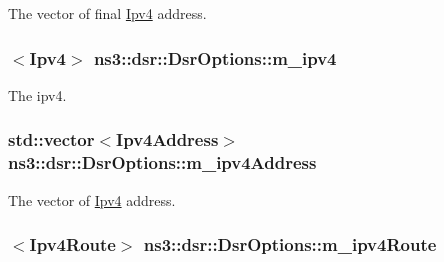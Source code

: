 The vector of final \hyperlink{classns3_1_1Ipv4}{Ipv4} address. 

\subsubsection[{\texorpdfstring{m\+\_\+ipv4}{m_ipv4}}]{$<${\bf Ipv4}$>$ ns3\+::dsr\+::\+Dsr\+Options\+::m\+\_\+ipv4\hspace{0.3cm}{\ttfamily [protected]}}\hypertarget{classns3_1_1dsr_1_1DsrOptions_aa4b94045e6c0467666c4e4efa63c7a4d}{}\label{classns3_1_1dsr_1_1DsrOptions_aa4b94045e6c0467666c4e4efa63c7a4d}


The ipv4. 

\subsubsection[{\texorpdfstring{m\+\_\+ipv4\+Address}{m_ipv4Address}}]{\setlength{\rightskip}{0pt plus 5cm}std\+::vector$<${\bf Ipv4\+Address}$>$ ns3\+::dsr\+::\+Dsr\+Options\+::m\+\_\+ipv4\+Address\hspace{0.3cm}{\ttfamily [protected]}}\hypertarget{classns3_1_1dsr_1_1DsrOptions_ae89beb25929568d3d6053c263a627d3d}{}\label{classns3_1_1dsr_1_1DsrOptions_ae89beb25929568d3d6053c263a627d3d}


The vector of \hyperlink{classns3_1_1Ipv4}{Ipv4} address. 

\subsubsection[{\texorpdfstring{m\+\_\+ipv4\+Route}{m_ipv4Route}}]{$<${\bf Ipv4\+Route}$>$ ns3\+::dsr\+::\+Dsr\+Options\+::m\+\_\+ipv4\+Route\hspace{0.3cm}{\ttfamily [protected]}}\hypertarget{classns3_1_1dsr_1_1DsrOptions_ae4785209eae1d101cb8bd2d3b392d2ad}{}\label{classns3_1_1dsr_1_1DsrOptions_ae4785209eae1d101cb8bd2d3b392d2ad}


